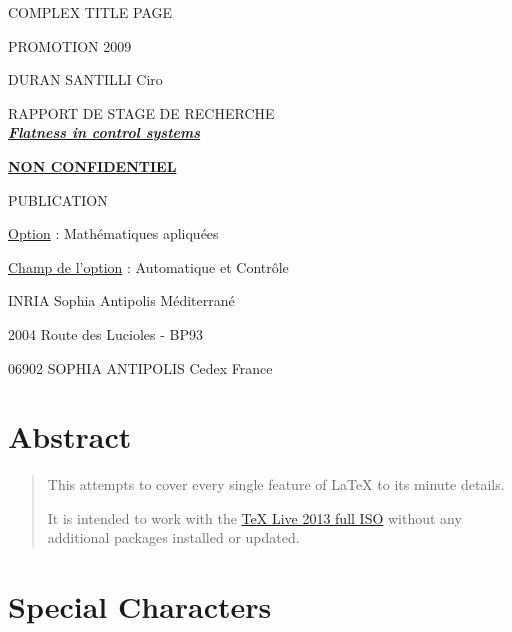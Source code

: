 \documentclass[12pt]{article}
\begin{document}
  \begin{titlepage}
    COMPLEX TITLE PAGE

    PROMOTION 2009

    DURAN SANTILLI Ciro

    \vspace{40 mm}

    \begin{center}

      {\large RAPPORT DE STAGE DE RECHERCHE}\\[0.5cm]

      \underline{ \large \bfseries \itshape Flatness in control systems}

      \vspace{10 mm}

      \underline{ \bfseries NON CONFIDENTIEL }

      PUBLICATION

    \end{center}

    \vspace{40 mm}

    \underline{Option} : Mathématiques apliquées

    \underline{Champ de l'option} : Automatique et Contrôle

    \vspace{5 mm}

    INRIA Sophia Antipolis Méditerrané

    2004 Route des Lucioles - BP93

    06902 SOPHIA ANTIPOLIS Cedex France
  \end{titlepage}

  \newpage

\section{Abstract} \label{abstract}

  \begin{abstract}
    This attempts to cover every single feature of LaTeX to its minute details.

    It is intended to work with the \href{https://www.tug.org/texlive/acquire-iso.html}{TeX Live 2013 full ISO} without any additional packages installed or updated.
  \end{abstract}
  \newpage

\section{Special Characters}
\end{document}
